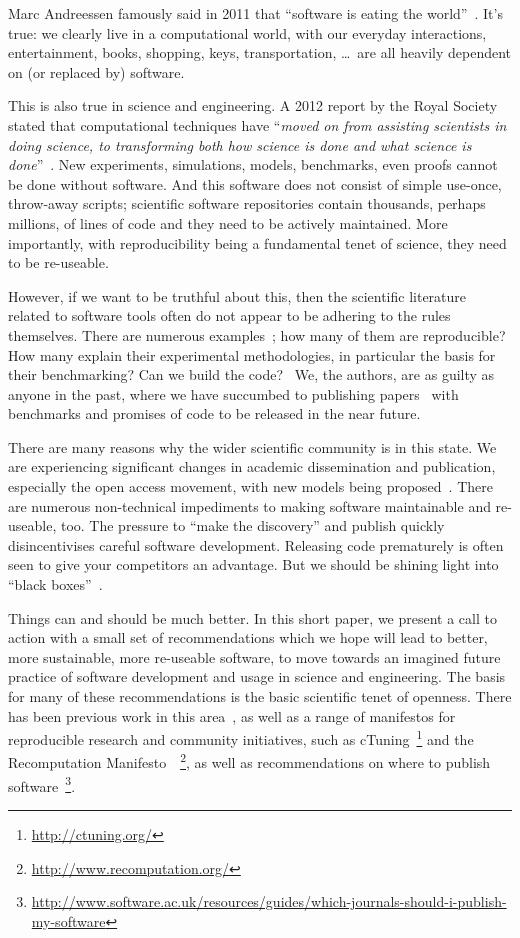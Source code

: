 \documentclass[conference]{IEEEtran}
\begin{document}
Marc Andreessen famously said in 2011 that ``software is eating the
world''~\cite{andreessen:2011}. It's true: we clearly live in a
computational world, with our everyday interactions, entertainment,
books, shopping, keys, transportation, \dots\ are all heavily dependent on (or
replaced by) software.

This is also true in science and engineering. A 2012 report by the
Royal Society stated that computational techniques have ``{\emph{moved
on from assisting scientists in doing science, to transforming both
how science is done and what science is
done}}''~\cite{rssaaoe:2012}. New experiments, simulations, models,
benchmarks, even proofs cannot be done without software. And this
software does not consist of simple use-once, throw-away scripts;
scientific software repositories contain thousands, perhaps millions,
of lines of code and they need to be actively maintained. More
importantly, with reproducibility being a fundamental tenet of
science, they need to be re-useable.

However, if we want to be truthful about this, then the scientific
literature related to software tools often do not appear to be
adhering to the rules themselves. There are numerous
examples~\cite{beck-et-al:2005,prosser:2012}; how many of them are
reproducible? How many explain their experimental methodologies, in
particular the basis for their benchmarking? Can we build the
code?~\cite{collberg-et-al:2014} We, the authors, are as guilty as
anyone in the past, where we have succumbed to publishing
papers~\cite{crick-et-al:2009,Berdine2011SLAyer} with benchmarks and
promises of code to be released in the near future.

There are many reasons why the wider scientific community is in this
state. We are experiencing significant changes in academic
dissemination and publication, especially the open access movement,
with new models being
proposed~\cite{stodden-et-al:2013,fursin+dubach:2014}.  There are
numerous non-technical impediments to making software maintainable and
re-useable, too. The pressure to ``make the discovery'' and publish
quickly disincentivises careful software development. Releasing
code prematurely is often seen to give your competitors an
advantage. But we should be shining light into ``black
boxes''~\cite{morin-et-al:2012}.

Things can and should be much better. In this short paper, we
present a call to action with a small set of recommendations which we
hope will lead to better, more sustainable, more re-useable software,
to move towards an imagined future practice of software development
and usage in science and engineering.  The basis for many of these
recommendations is the basic scientific tenet of openness. There has
been previous work in this
area~\cite{sim-et-al:2003,chirigati-et-al:2013}, as well as a range of
manifestos for reproducible research and community initiatives, such
as cTuning~\footnote{\url{http://ctuning.org/}} and the Recomputation
Manifesto~\cite{gent:2013}~\footnote{\url{http://www.recomputation.org/}},
as well as recommendations on where to publish
software~\footnote{\url{http://www.software.ac.uk/resources/guides/which-journals-should-i-publish-my-software}}.
\end{document}
